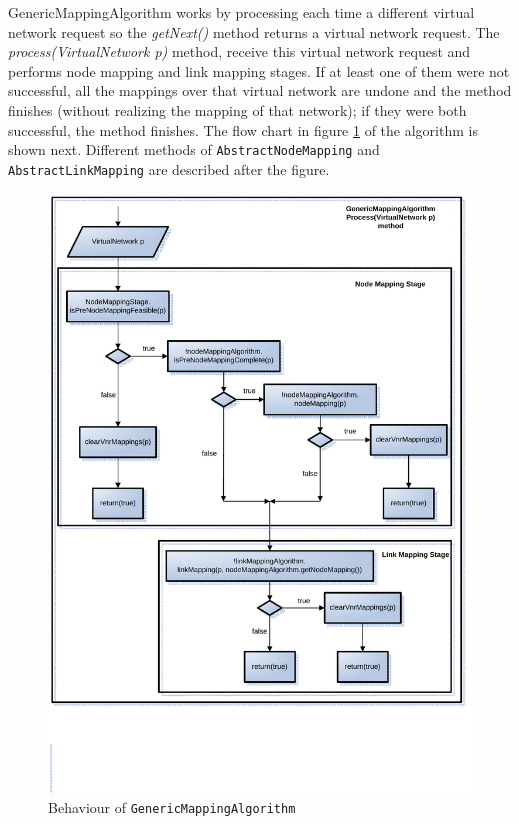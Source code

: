 GenericMappingAlgorithm works by processing each time a different virtual network 
request so the \textsl{getNext()} method returns a virtual network request. 
The \textsl{process(VirtualNetwork p)} method, 
receive this virtual network request and performs node mapping and link mapping stages. 
If at least one of them were not successful, 
all the mappings over that virtual network are undone and the method finishes 
(without realizing the mapping of that network); if they were both successful, 
the method finishes. 
The flow chart in figure \ref{fig:genericMappingAlgorithm} of the algorithm is shown next.
Different methods of \texttt{AbstractNodeMapping} and \texttt{AbstractLinkMapping} are described after the figure.
\begin{figure}[h]
  \begin{center}
		\includegraphics[width=\textwidth]{img/genericMappingAlgorithm.pdf}
	\end{center}
	\caption{Behaviour of \texttt{GenericMappingAlgorithm} }
	\label{fig:genericMappingAlgorithm}
\end{figure}

